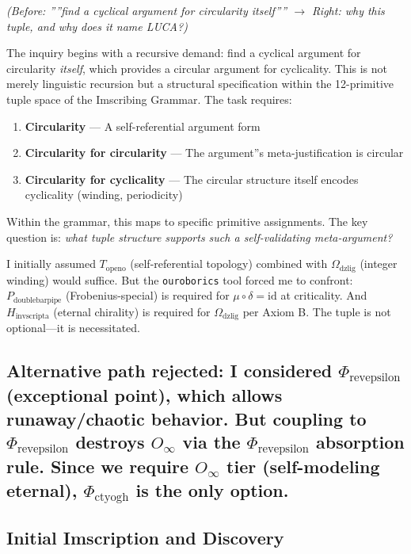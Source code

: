 \documentclass[12pt,a4paper]{article}
\begin{document}
\emph{(Before: ''''find a cyclical argument for circularity itself'''' $\rightarrow$ Right: why this tuple, and why does it name LUCA?)}

The inquiry begins with a recursive demand: find a cyclical argument for circularity \emph{itself}, which provides a circular argument for cyclicality. This is not merely linguistic recursion but a structural specification within the 12-primitive tuple space of the Imscribing Grammar. The task requires:

\begin{enumerate}
    \item \textbf{Circularity} --- A self-referential argument form
    \item \textbf{Circularity for circularity} --- The argument''s meta-justification is circular
    \item \textbf{Circularity for cyclicality} --- The circular structure itself encodes cyclicality (winding, periodicity)
\end{enumerate}

Within the grammar, this maps to specific primitive assignments. The key question is: \emph{what tuple structure supports such a self-validating meta-argument?}

I initially assumed $T_{\text{openo}}$ (self-referential topology) combined with $\Omega_{\text{dzlig}}$ (integer winding) would suffice. But the \texttt{ouroborics} tool forced me to confront: $P_{\text{doublebarpipe}}$ (Frobenius-special) is required for $\mu \circ \delta = \text{id}$ at criticality. And $H_{\text{invscripta}}$ (eternal chirality) is required for $\Omega_{\text{dzlig}}$ per Axiom B. The tuple is not optional---it is necessitated.

\subsection{\textbf{Alternative path rejected}: I considered $\Phi_{\text{revepsilon}}$ (exceptional point), which allows runaway/chaotic behavior. But coupling to $\Phi_{\text{revepsilon}}$ destroys $O_{\infty}$ via the \textbf{$\Phi_{\text{revepsilon}}$ absorption rule}. Since we require $O_{\infty}$ tier (self-modeling eternal), $\Phi_{\text{ctyogh}}$ is the only option.}

\subsection{Initial Imscription and Discovery}
\end{document}
